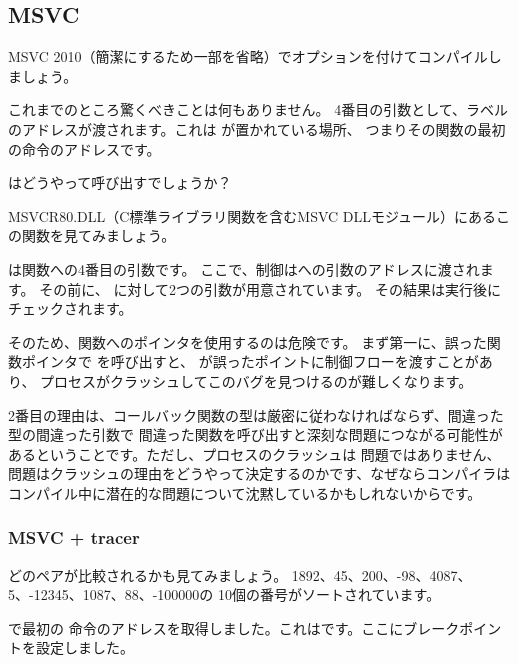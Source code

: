\subsection{MSVC}

MSVC 2010（簡潔にするため一部を省略）で\TT{\Ox}オプションを付けてコンパイルしましょう。



これまでのところ驚くべきことは何もありません。 
4番目の引数として、ラベルのアドレスが渡されます。これは \comp が置かれている場所、
つまりその関数の最初の命令のアドレスです。

\qsort はどうやって呼び出すでしょうか？


MSVCR80.DLL（C標準ライブラリ関数を含むMSVC DLLモジュール）にあるこの関数を見てみましょう。



は関数への4番目の引数です。 
ここで、制御はへの引数のアドレスに渡されます。
その前に、 \comp に対して2つの引数が用意されています。 その結果は実行後にチェックされます。

そのため、関数へのポインタを使用するのは危険です。 
まず第一に、誤った関数ポインタで \qsort を呼び出すと、 \qsort が誤ったポイントに制御フローを渡すことがあり、
プロセスがクラッシュしてこのバグを見つけるのが難しくなります。

2番目の理由は、コールバック関数の型は厳密に従わなければならず、間違った型の間違った引数で
間違った関数を呼び出すと深刻な問題につながる可能性があるということです。ただし、プロセスのクラッシュは
問題ではありません、問題はクラッシュの理由をどうやって決定するのかです、なぜならコンパイラは
コンパイル中に潜在的な問題について沈黙しているかもしれないからです。



\subsubsection{MSVC + tracer}

どのペアが比較されるかも見てみましょう。 
1892、45、200、-98、4087、5、-12345、1087、88、-100000の
10個の番号がソートされています。

\comp で最初の \CMP 命令のアドレスを取得しました。これはです。ここにブレークポイントを設定しました。

